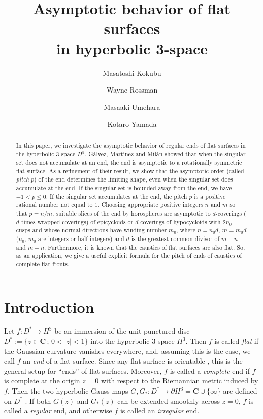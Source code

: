 \documentclass[a4paper]{amsart}
\title[Asymptotic behavior of flat surfaces]{
  Asymptotic behavior of flat  surfaces\\
  in hyperbolic 3-space}
\author[M.~Kokubu]{Masatoshi Kokubu}
\author[W.~Rossman]{Wayne Rossman}
\author[M.~Umehara]{Masaaki Umehara}
\author[K.~Yamada]{Kotaro Yamada}
\theoremstyle{plain}
\theoremstyle{remark}
\numberwithin{equation}{section}
\begin{document}
\begin{abstract}
 In this paper, we investigate the asymptotic behavior of regular
 ends of flat surfaces in the hyperbolic $3$-space $H^3$.
 G\'alvez, Mart\'\i{}nez and Mil\'an showed that when the singular set 
 does not accumulate at an end, 
 the end is asymptotic to a
 rotationally symmetric flat surface. 
 As a refinement of their result,
 we show that the asymptotic order (called {\it pitch\/} $p$) 
 of the end determines the limiting shape,
 even when the singular set does accumulate at the end.
 If the singular set is bounded away from the end, we have $-1<p\le 0$. 
 If the singular set accumulates at the end, 
 the pitch $p$ is a positive rational number
 not equal to $1$.  
 Choosing appropriate positive integers $n$ and $m$ so that $p=n/m$, 
 suitable slices of the end by horospheres are asymptotic to 
 $d$-coverings ($d$-times wrapped coverings) of epicycloids
 or $d$-coverings of hypocycloids with $2n_0$ cusps and whose normal
 directions have  winding number $m_0$, where $n=n_0d$, $m=m_0d$ 
 ($n_0$, $m_0$ are integers or half-integers) and
 $d$ is the greatest common divisor of $m-n$ and $m+n$. 
 Furthermore, it is known that the caustics of flat surfaces are also 
 flat.  
 So, as an application, we give a useful explicit formula for the pitch
 of ends of caustics of complete flat fronts.
\end{abstract}

\maketitle

\section*{Introduction}
\begingroup

Let $f\colon{}D^*\to H^3$ be an immersion of the unit punctured disc
$D^*:=\{z\in {\boldsymbol{C}}\,;\, 0<|z|<1\}$ into the hyperbolic $3$-space $H^3$.
Then $f$ is called {\it flat\/} if the Gaussian curvature vanishes
everywhere, 
and, assuming this is the case,
we call $f$ an {\it end\/} of a flat surface.
Since any flat surface is orientable \cite{KRUY}, this is the general
setup for ``ends'' of flat surfaces.
Moreover, $f$ is called a {\it complete\/} end if $f$ is complete at the
origin $z=0$ with respect to the Riemannian metric induced by $f$.
Then the two hyperbolic Gauss maps 
$G,G_* \colon D^*\to \partial H^3={\boldsymbol{C}}\cup\{\infty\}$ are defined on $D^*$
\cite{GMM}.  
If both $G(z)$ and $G_*(z)$ can be extended smoothly across $z=0$,
$f$ is called a {\it regular\/} end, and otherwise $f$ is called an 
{\it irregular\/} end.
\end{document}
